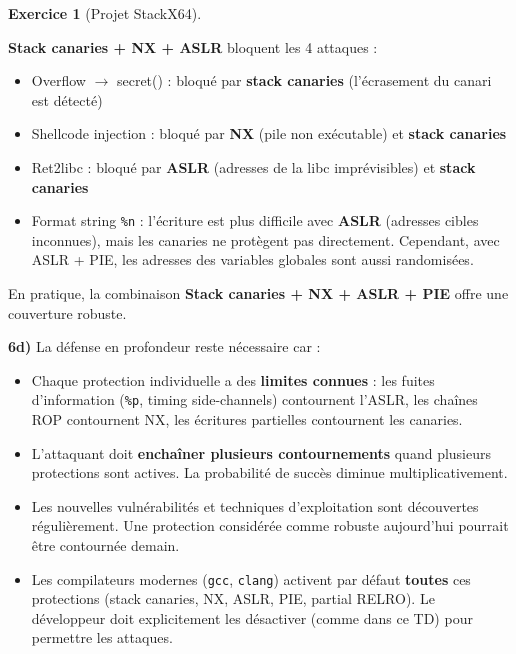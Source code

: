 \documentclass[a4paper,11pt]{article}
\theoremstyle{plain}
\theoremstyle{definition}
\newtheorem{exercice}{Exercice}
\begin{document}
\begin{exercice}[Projet StackX64]
\begin{correction}
\textbf{Stack canaries + NX + ASLR} bloquent les 4 attaques :
\begin{itemize}
    \item Overflow $\to$ secret() : bloqué par \textbf{stack canaries} (l'écrasement du canari est détecté)
    \item Shellcode injection : bloqué par \textbf{NX} (pile non exécutable) et \textbf{stack canaries}
    \item Ret2libc : bloqué par \textbf{ASLR} (adresses de la libc imprévisibles) et \textbf{stack canaries}
    \item Format string \texttt{\%n} : l'écriture est plus difficile avec \textbf{ASLR} (adresses cibles inconnues), mais les canaries ne protègent pas directement. Cependant, avec ASLR + PIE, les adresses des variables globales sont aussi randomisées.
\end{itemize}

En pratique, la combinaison \textbf{Stack canaries + NX + ASLR + PIE} offre une couverture robuste.

\textbf{6d)} La défense en profondeur reste nécessaire car :
\begin{itemize}
    \item Chaque protection individuelle a des \textbf{limites connues} : les fuites d'information (\texttt{\%p}, timing side-channels) contournent l'ASLR, les chaînes ROP contournent NX, les écritures partielles contournent les canaries.
    \item L'attaquant doit \textbf{enchaîner plusieurs contournements} quand plusieurs protections sont actives. La probabilité de succès diminue multiplicativement.
    \item Les nouvelles vulnérabilités et techniques d'exploitation sont découvertes régulièrement. Une protection considérée comme robuste aujourd'hui pourrait être contournée demain.
    \item Les compilateurs modernes (\texttt{gcc}, \texttt{clang}) activent par défaut \textbf{toutes} ces protections (stack canaries, NX, ASLR, PIE, partial RELRO). Le développeur doit explicitement les désactiver (comme dans ce TD) pour permettre les attaques.
\end{itemize}


\end{correction}
\end{exercice}
\end{document}
